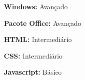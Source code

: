 \begin{rubric}{}

  \entry* \textbf{Windows:} Avançado

  \entry* \textbf{Pacote Office:} Avançado

  \entry* \textbf{HTML:} Intermediário

  \entry* \textbf{CSS:} Intermediário

  \entry* \textbf{Javascript:} Básico

\end{rubric}
